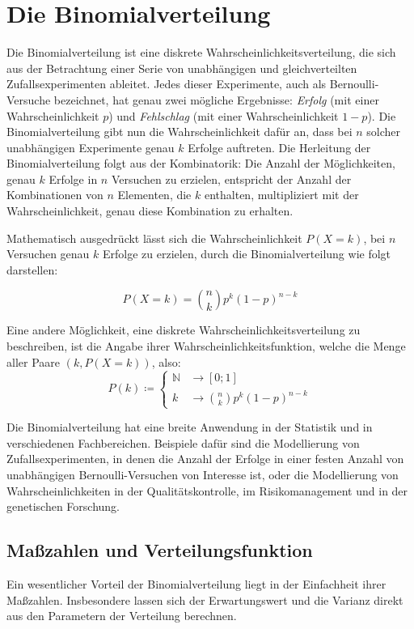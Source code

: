 \section{Die Binomialverteilung}

Die Binomialverteilung ist eine diskrete Wahrscheinlichkeitsverteilung, die sich aus der Betrachtung einer Serie von unabhängigen und gleichverteilten Zufallsexperimenten ableitet.
Jedes dieser Experimente, auch als Bernoulli-Versuche bezeichnet, hat genau zwei mögliche Ergebnisse: \textit{Erfolg} (mit einer Wahrscheinlichkeit $p$) und \textit{Fehlschlag} (mit einer Wahrscheinlichkeit $1-p$).
\newline \newline
Die Binomialverteilung gibt nun die Wahrscheinlichkeit dafür an, dass bei $n$ solcher unabhängigen Experimente genau $k$ Erfolge auftreten.
Die Herleitung der Binomialverteilung folgt aus der Kombinatorik: Die Anzahl der Möglichkeiten, genau $k$ Erfolge in $n$ Versuchen zu erzielen, entspricht der Anzahl der Kombinationen von $n$ Elementen, die $k$ enthalten, multipliziert mit der Wahrscheinlichkeit, genau diese Kombination zu erhalten.

Mathematisch ausgedrückt lässt sich die Wahrscheinlichkeit $P(X=k)$, bei $n$ Versuchen genau $k$ Erfolge zu erzielen, durch die Binomialverteilung wie folgt darstellen:

\[
    P(X=k) = {n \choose k} p^k (1-p)^{n-k}
\]

Eine andere Möglichkeit, eine diskrete Wahrscheinlichkeitsverteilung zu beschreiben, ist die Angabe ihrer Wahrscheinlichkeitsfunktion, welche die Menge aller Paare $(k, P(X=k))$, also:
\[
    P(k) \coloneqq
    \begin{cases}
        \mathbb{N} &\rightarrow [0;1] \\
        k &\rightarrow {n \choose k} p^k (1-p)^{n-k}
    \end{cases}
\]

Die Binomialverteilung hat eine breite Anwendung in der Statistik und in verschiedenen Fachbereichen.
Beispiele dafür sind die Modellierung von Zufallsexperimenten, in denen die Anzahl der Erfolge in einer festen Anzahl von unabhängigen Bernoulli-Versuchen von Interesse ist, oder die Modellierung von Wahrscheinlichkeiten in der Qualitätskontrolle, im Risikomanagement und in der genetischen Forschung.

\subsection{Maßzahlen und Verteilungsfunktion}
Ein wesentlicher Vorteil der Binomialverteilung liegt in der Einfachheit ihrer Maßzahlen.
Insbesondere lassen sich der Erwartungswert und die Varianz direkt aus den Parametern der Verteilung berechnen.

